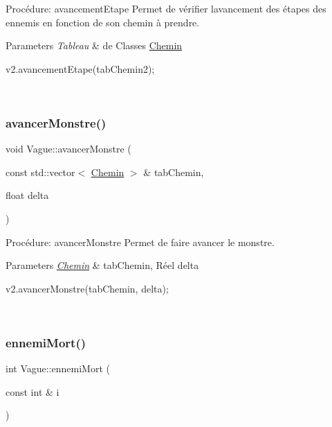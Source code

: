 Procédure\+: avancement\+Etape Permet de vérifier l\textquotesingle{}avancement des étapes des ennemis en fonction de son chemin à prendre. 


\begin{DoxyParams}{Parameters}
{\em Tableau} & de Classes \hyperlink{classChemin}{Chemin} 
\begin{DoxyCode}
v2.avancementEtape(tabChemin2);
\end{DoxyCode}
 \\
\hline
\end{DoxyParams}
\mbox{\label{classVague_a2a81df1228dfa2ad84109612ef378d4c}} 
\subsubsection{\texorpdfstring{avancer\+Monstre()}{avancerMonstre()}}
{\footnotesize\ttfamily void Vague\+::avancer\+Monstre (\begin{DoxyParamCaption}\item[{const std\+::vector$<$ \hyperlink{classChemin}{Chemin} $>$ \&}]{tab\+Chemin,  }\item[{float}]{delta }\end{DoxyParamCaption})}



Procédure\+: avancer\+Monstre Permet de faire avancer le monstre. 


\begin{DoxyParams}{Parameters}
{\em \hyperlink{classChemin}{Chemin}} & tab\+Chemin, Réel delta 
\begin{DoxyCode}
v2.avancerMonstre(tabChemin, delta);
\end{DoxyCode}
 \\
\hline
\end{DoxyParams}
\mbox{\label{classVague_ad732fb032c4b02416946736b1e25dcc8}} 
\subsubsection{\texorpdfstring{ennemi\+Mort()}{ennemiMort()}}
{\footnotesize\ttfamily int Vague\+::ennemi\+Mort (\begin{DoxyParamCaption}\item[{const int \&}]{i }\end{DoxyParamCaption})}



